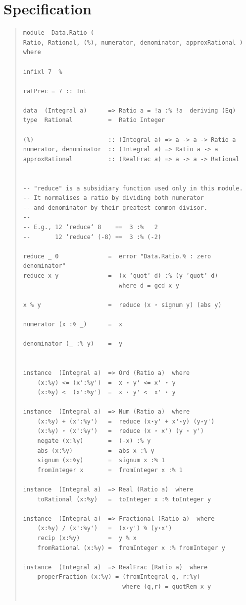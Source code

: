 \section{Specification}
\begin{quote}
{\haddockverb\begin{verbatim}
module  Data.Ratio (
Ratio, Rational, (%), numerator, denominator, approxRational ) where

infixl 7  %

ratPrec = 7 :: Int

data  (Integral a)      => Ratio a = !a :% !a  deriving (Eq)
type  Rational          =  Ratio Integer

(%)                     :: (Integral a) => a -> a -> Ratio a
numerator, denominator  :: (Integral a) => Ratio a -> a
approxRational          :: (RealFrac a) => a -> a -> Rational


-- "reduce" is a subsidiary function used only in this module.
-- It normalises a ratio by dividing both numerator
-- and denominator by their greatest common divisor.
--
-- E.g., 12 ‘reduce‘ 8    ==  3 :%   2
--       12 ‘reduce‘ (-8) ==  3 :% (-2)

reduce _ 0              =  error "Data.Ratio.% : zero denominator"
reduce x y              =  (x ‘quot‘ d) :% (y ‘quot‘ d)
                           where d = gcd x y

x % y                   =  reduce (x ⋆ signum y) (abs y)

numerator (x :% _)      =  x

denominator (_ :% y)    =  y


instance  (Integral a)  => Ord (Ratio a)  where
    (x:%y) <= (x':%y')  =  x ⋆ y' <= x' ⋆ y
    (x:%y) <  (x':%y')  =  x ⋆ y' <  x' ⋆ y

instance  (Integral a)  => Num (Ratio a)  where
    (x:%y) + (x':%y')   =  reduce (x⋆y' + x'⋆y) (y⋆y')
    (x:%y) ⋆ (x':%y')   =  reduce (x ⋆ x') (y ⋆ y')
    negate (x:%y)       =  (-x) :% y
    abs (x:%y)          =  abs x :% y
    signum (x:%y)       =  signum x :% 1
    fromInteger x       =  fromInteger x :% 1

instance  (Integral a)  => Real (Ratio a)  where
    toRational (x:%y)   =  toInteger x :% toInteger y

instance  (Integral a)  => Fractional (Ratio a)  where
    (x:%y) / (x':%y')   =  (x⋆y') % (y⋆x')
    recip (x:%y)        =  y % x
    fromRational (x:%y) =  fromInteger x :% fromInteger y

instance  (Integral a)  => RealFrac (Ratio a)  where
    properFraction (x:%y) = (fromIntegral q, r:%y)
                            where (q,r) = quotRem x y


\end{verbatim}}
\end{quote}
